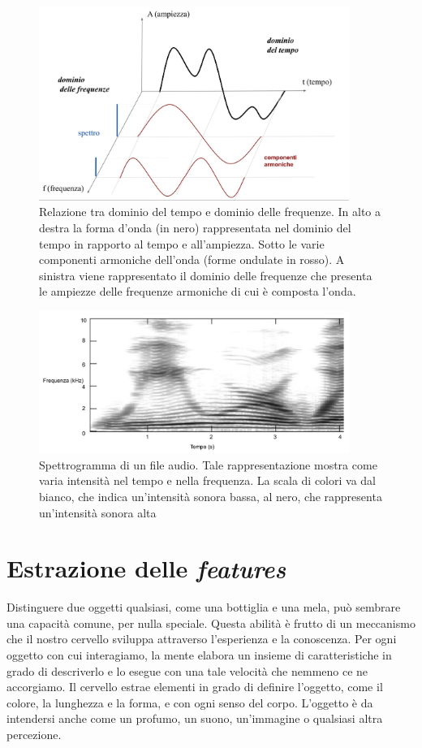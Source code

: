 \begin{figure}[htp] 
	\centering 
	\includegraphics[width=0.9\textwidth]{img/cap2-dominioTempoFrequenza.jpg}
	\caption{Relazione tra dominio del tempo e dominio delle frequenze. In alto a destra la forma d’onda (in nero)
		rappresentata nel dominio del tempo in rapporto al tempo e all’ampiezza. Sotto le varie componenti armoniche
		dell’onda (forme ondulate in rosso). A sinistra viene rappresentato il dominio delle frequenze che presenta le
		ampiezze delle frequenze armoniche di cui è composta l’onda.} 
	\label{fig2.1}
\end{figure}
\begin{figure}[htp]
	\centering
	\includegraphics[width=0.9\textwidth]{img/cap2-spettrogramma.jpg}
	\caption{Spettrogramma di un file audio. Tale rappresentazione mostra come varia intensità nel tempo e nella frequenza. La scala di colori va dal bianco, che indica un'intensità sonora bassa, al nero, che rappresenta un'intensità sonora alta}
	\label{fig2.2}
\end{figure}

\clearpage
\section{Estrazione delle \textit{features}}
Distinguere due oggetti qualsiasi, come una bottiglia e una mela, può sembrare una capacità
comune, per nulla speciale. Questa abilità è frutto di un meccanismo che il nostro cervello
sviluppa attraverso l’esperienza e la conoscenza. Per ogni oggetto con cui interagiamo, la
mente elabora un insieme di caratteristiche in grado di descriverlo e lo esegue con una tale
velocità che nemmeno ce ne accorgiamo. Il cervello estrae elementi in grado di definire
l’oggetto, come il colore, la lunghezza e la forma, e con ogni senso del corpo. L’oggetto è da
intendersi anche come un profumo, un suono, un'immagine o qualsiasi altra percezione.

